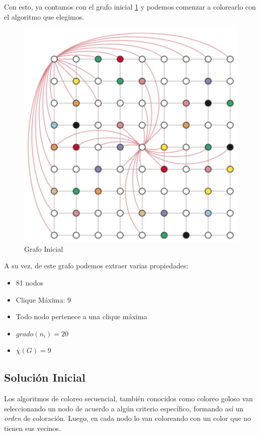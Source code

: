 \documentclass[a4paper,spanish]{article}
\begin{document}
Con esto, ya contamos con el grafo inicial \ref{img:grafo_inicial} y podemos
comenzar a colorearlo con el algoritmo que elegimos.

\begin{figure}[h]
	\centering
	\includegraphics[scale=0.5]{./img/grafo_inicial.png}
    \caption{Grafo Inicial}
    \label{img:grafo_inicial}
\end{figure}

A su vez, de este grafo podemos extraer varias propiedades:

\begin{itemize}
	\item 81 nodos
	\item Clique Máxima: 9
	\item Todo nodo pertenece a una clique máxima
	\item $ grado(n_i) = 20 $
	\item $ \chi(G) = 9 $
\end{itemize}


\subsection{Solución Inicial}

Los algoritmos de coloreo secuencial, también conocidos como coloreo goloso van seleccionando un nodo
de acuerdo a algún criterio específico, formando así un \emph{orden} de coloración.
Luego, en cada nodo lo van coloreando con un color que no tienen sus vecinos.
 
\end{document}

